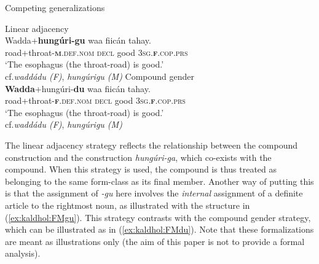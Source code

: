 \documentclass[output=paper]{langscibook}
\begin{document}
\ea
	Competing generalizations
	\begin{xlist}
		\ex\label{ex:kaldhol:waddohunguriga}
		Linear adjacency\\
		\gll Wadda+\textbf{hungúri-gu} waa fiicán tahay.\\
		road+throat-\textsc{\textbf{m}.def.nom} \textsc{decl} good \textsc{3sg.\textbf{f}}.\textsc{cop.prs}\\
		\glt `The esophagus (the throat-road) is good.'\\
		\glt cf.\@ \textit{waddádu (F)}, \textit{hungúrigu (M)}
		\ex\label{ex:kaldhol:waddohungurida}
		Compound gender\\
		\gll \textbf{Wadda}+hungúri-\textbf{du} waa fiicán tahay.\\
		road+throat-\textsc{\textbf{f}.def.nom} \textsc{decl} good \textsc{3sg.\textbf{f}}.\textsc{cop.prs}\\
		\glt `The esophagus (the throat-road) is good.' \\
		cf.\@ \textit{waddádu (F)}, \textit{hungúrigu (M)}
	\end{xlist}
\z
The linear adjacency strategy reflects the relationship between the compound construction and the construction \textit{hungúri-ga}, which co-exists with the compound. When this strategy is used, the compound is thus treated as belonging to the same form-class as its final member. Another way of putting this is that the assignment of \textit{-gu} here involves the \textit{internal} assignment of a definite article to the rightmost noun, as illustrated with the structure in (\ref{ex:kaldhol:FMgu}). This strategy contrasts with the compound gender strategy, which can be illustrated as in (\ref{ex:kaldhol:FMdu}). Note that these formalizations are meant as illustrations only (the aim of this paper is not to provide a formal analysis).
\end{document}
